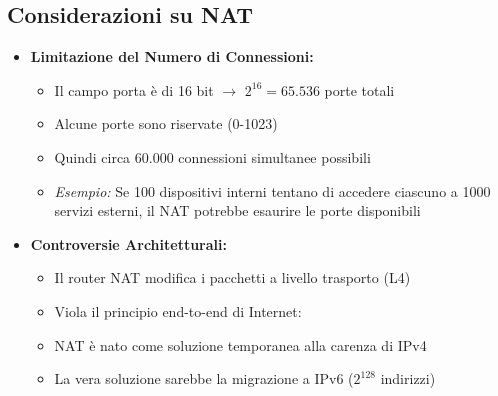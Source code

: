 \subsection{Considerazioni su NAT}
\begin{itemize}
    \item \textbf{Limitazione del Numero di Connessioni:}
    \begin{itemize}
        \item Il campo porta è di 16 bit $\rightarrow$ $2^{16} = 65.536$ porte totali
        \item Alcune porte sono riservate (0-1023)
        \item Quindi circa 60.000 connessioni simultanee possibili
        \item \textit{Esempio:} Se 100 dispositivi interni tentano di accedere ciascuno a 1000 servizi esterni, il NAT potrebbe esaurire le porte disponibili
    \end{itemize}
    
    \item \textbf{Controversie Architetturali:}
    \begin{itemize}
        \item Il router NAT modifica i pacchetti a livello trasporto (L4)
        \item Viola il principio end-to-end di Internet:
        \begin{center}
        \end{center}
        \item NAT è nato come soluzione temporanea alla carenza di IPv4
        \item La vera soluzione sarebbe la migrazione a IPv6 ($2^{128}$ indirizzi)
    \end{itemize}
    

\end{itemize}
